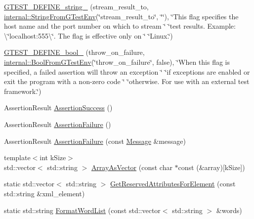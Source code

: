 \begin{DoxyCompactItemize}
\item 
\mbox{\hyperlink{namespacetesting_a5cfe9778e1cc8b5cf04bfe9e764ddff6}{G\+T\+E\+S\+T\+\_\+\+D\+E\+F\+I\+N\+E\+\_\+string\+\_\+}} (stream\+\_\+result\+\_\+to, \mbox{\hyperlink{namespacetesting_1_1internal_a7ed785df46a339403b0f749d3a879201}{internal\+::\+String\+From\+G\+Test\+Env}}(\char`\"{}stream\+\_\+result\+\_\+to\char`\"{}, \char`\"{}\char`\"{}), \char`\"{}This flag specifies the host name and the port number on which to stream \char`\"{} \char`\"{}test results. Example\+: \textbackslash{}\char`\"{}localhost\+:555\textbackslash{}\char`\"{}. The flag is effective only on \char`\"{} \char`\"{}Linux.\char`\"{})
\item 
\mbox{\hyperlink{namespacetesting_a2850b20fc3080527fae82aa170ef9aa5}{G\+T\+E\+S\+T\+\_\+\+D\+E\+F\+I\+N\+E\+\_\+bool\+\_\+}} (throw\+\_\+on\+\_\+failure, \mbox{\hyperlink{namespacetesting_1_1internal_a67132cdce23fb71b6c38ee34ef81eb4c}{internal\+::\+Bool\+From\+G\+Test\+Env}}(\char`\"{}throw\+\_\+on\+\_\+failure\char`\"{}, false), \char`\"{}When this flag is specified, a failed assertion will throw an exception \char`\"{} \char`\"{}if exceptions are enabled or exit the program with a non-\/zero code \char`\"{} \char`\"{}otherwise. For use with an external test framework.\char`\"{})
\item 
Assertion\+Result \mbox{\hyperlink{namespacetesting_ac1d0baedb17286c5c6c87bd1a45da8ac}{Assertion\+Success}} ()
\item 
Assertion\+Result \mbox{\hyperlink{namespacetesting_a75cb789614cb1c28c34627a4a3c053df}{Assertion\+Failure}} ()
\item 
Assertion\+Result \mbox{\hyperlink{namespacetesting_a56f59110a218942d2fc4695914b1685c}{Assertion\+Failure}} (const \mbox{\hyperlink{classtesting_1_1Message}{Message}} \&message)
\item 
{\footnotesize template$<$int k\+Size$>$ }\\std\+::vector$<$ std\+::string $>$ \mbox{\hyperlink{namespacetesting_a956d4c522454fa6dfd75b5bbbefe8f9e}{Array\+As\+Vector}} (const char $\ast$const (\&array)\mbox{[}k\+Size\mbox{]})
\item 
static std\+::vector$<$ std\+::string $>$ \mbox{\hyperlink{namespacetesting_acb3fdfadf475a3c2f5e22a3dae73532a}{Get\+Reserved\+Attributes\+For\+Element}} (const std\+::string \&xml\+\_\+element)
\item 
static std\+::string \mbox{\hyperlink{namespacetesting_a4354761948a5cf56fdf905418a0f78f1}{Format\+Word\+List}} (const std\+::vector$<$ std\+::string $>$ \&words)

\end{DoxyCompactItemize}
